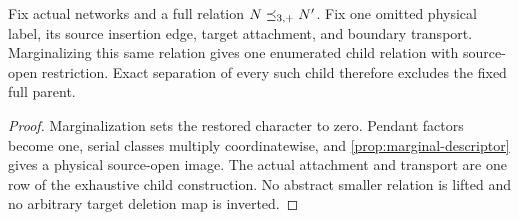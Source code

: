 \begin{lemma}\label{lem:fixed-restoration}
Fix actual networks and a full relation \(N\preceq_{3,+} N'\).  Fix one omitted
physical label, its source insertion edge, target attachment, and boundary
transport.  Marginalizing this same relation gives one enumerated child
relation with source-open restriction.  Exact separation of every such child
therefore excludes the fixed full parent.
\end{lemma}

\begin{proof}
Marginalization sets the restored character to zero.  Pendant factors become
one, serial classes multiply coordinatewise, and
\cref{prop:marginal-descriptor} gives a physical source-open image.
The actual attachment and transport are one row of the exhaustive child
construction.  No abstract smaller relation is lifted and no arbitrary
target deletion map is inverted.
\end{proof}
